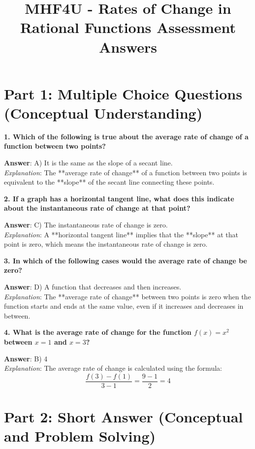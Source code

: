 \documentclass{article}
\title{MHF4U - Rates of Change in Rational Functions Assessment Answers}
\author{}
\date{}
\begin{document}
\maketitle

\section*{Part 1: Multiple Choice Questions (Conceptual Understanding)}

\textbf{1. Which of the following is true about the average rate of change of a function between two points?}

\textbf{Answer}: A) It is the same as the slope of a secant line. \\
\textit{Explanation}: The **average rate of change** of a function between two points is equivalent to the **slope** of the secant line connecting these points.

\bigskip

\textbf{2. If a graph has a horizontal tangent line, what does this indicate about the instantaneous rate of change at that point?}

\textbf{Answer}: C) The instantaneous rate of change is zero. \\
\textit{Explanation}: A **horizontal tangent line** implies that the **slope** at that point is zero, which means the instantaneous rate of change is zero.

\bigskip

\textbf{3. In which of the following cases would the average rate of change be zero?}

\textbf{Answer}: D) A function that decreases and then increases. \\
\textit{Explanation}: The **average rate of change** between two points is zero when the function starts and ends at the same value, even if it increases and decreases in between.

\bigskip

\textbf{4. What is the average rate of change for the function \( f(x) = x^2 \) between \( x = 1 \) and \( x = 3 \)?}

\textbf{Answer}: B) 4 \\
\textit{Explanation}: The average rate of change is calculated using the formula:
\[
\frac{f(3) - f(1)}{3 - 1} = \frac{9 - 1}{2} = 4
\]

\newpage

\section*{Part 2: Short Answer (Conceptual and Problem Solving)}
\end{document}
